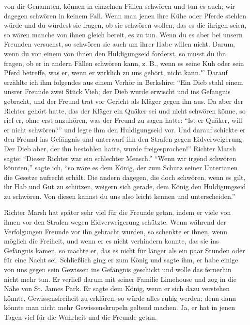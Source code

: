 von dir Genannten, können in einzelnen Fällen schwören und tun
es auch; wir dagegen schwören in keinem Fall. Wenn man jenen
ihre Kühe oder Pferde stehlen würde und du würdest sie fragen,
ob sie schwören wollen, das es die ihrigen seien, so wären manche
von ihnen gleich bereit, es zu tun. Wenn du es aber bei unsern
Freunden versuchst, so schwören sie auch um ihrer Habe willen
nicht. Darum, wenn du von einem von ihnen den Huldigungseid
forderst, so musst du ihn fragen, ob er in andern Fällen schwören
kann, z. B., wenn es seine Kuh oder sein Pferd betreffe, was er,
wenn er wirklich zu uns gehört, nicht kann."' Darauf erzählte
ich ihm folgendes aus einem Verhör in Berkshire: 
"`Ein Dieb stahl einem unsrer Freunde zwei Stück Vieh; der Dieb wurde erwischt
und ins Gefängnis gebracht, und der Freund trat vor Gericht
als Kläger gegen ihn aus. Da aber der Richter gehört hatte,
das der Kläger ein Quäker sei und nicht schwören könne, so rief
er, ohne erst anzuhören, was der Freund zu sagen hatte: "`Ist
er Quäker, will er nicht schwören?"' und legte ihm den Huldigungseid 
vor. Und darauf schickte er den Freund ins Gefängnis und unterwarf 
ihn den Strafen gegen Eidverweigerung. Der Dieb aber, der
ihn bestohlen hatte, wurde freigesprochen!"' Richter Marsh sagte:
"`Dieser Richter war ein schlechter Mensch."' "`Wenn wir irgend
schwören könnten,"' sagte ich, "`so wäre es dem König, der zum
Schutz seiner Untertanen die Gesetze aufrecht erhält. Die andern
dagegen, die doch schwören, wenn es gilt, ihr Hab und Gut zu
schützen, weigern sich gerade, dem König den Huldigungseid zu
schwören. Von diesen kannst du uns also leicht kennen und unterscheiden."'

Richter Marsh hat später sehr viel für die Freunde getan,
indem er viele von ihnen vor den Strafen wegen Eidverweigerung
schützte. Wenn während der Verfolgungen Freunde vor ihn gebracht
wurden, so schenkte er ihnen, wenn möglich die Freiheit, und wenn 
er es nicht verhindern konnte, das sie ins Gefängnis kamen, so
machte er, das es nicht für länger als ein paar Stunden oder
für eine Nacht sei. Schließlich ging er zum König und sagte
ihm, er habe einige von uns gegen sein Gewissen ins Gefängnis
geschickt und wolle das fernerhin nicht mehr tun. Er verließ
darum mit seiner Familie Limehouse und zog in die Nähe von
St. James Park. Er sagte dem König, wenn er sich dazu 
verstehen könnte, Gewissensfreiheit zu erklären, so würde alles ruhig
werden; denn dann könnte man nicht mehr Gewissenskrupeln
geltend machen. Ja, er hat in jenen Tagen viel für die Wahrheit 
und die Freunde getan.

